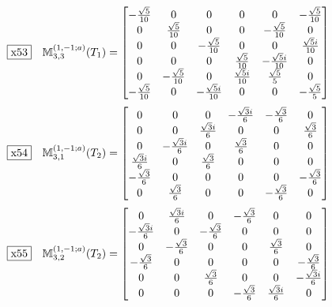 \documentclass[fleqn,10pt,landscape]{jsarticle}
\begin{document}
\begin{dmath*}
\fbox{x53}\quad \mathbb{M}_{3,3}^{(1,-1;a)}(T_{1})=\begin{bmatrix} - \frac{\sqrt{5}}{10} & 0 & 0 & 0 & 0 & - \frac{\sqrt{5}}{10} \\ 0 & \frac{\sqrt{5}}{10} & 0 & 0 & - \frac{\sqrt{5}}{10} & 0 \\ 0 & 0 & - \frac{\sqrt{5}}{10} & 0 & 0 & \frac{\sqrt{5} i}{10} \\ 0 & 0 & 0 & \frac{\sqrt{5}}{10} & - \frac{\sqrt{5} i}{10} & 0 \\ 0 & - \frac{\sqrt{5}}{10} & 0 & \frac{\sqrt{5} i}{10} & \frac{\sqrt{5}}{5} & 0 \\ - \frac{\sqrt{5}}{10} & 0 & - \frac{\sqrt{5} i}{10} & 0 & 0 & - \frac{\sqrt{5}}{5} \end{bmatrix}
\end{dmath*}
\begin{dmath*}
\fbox{x54}\quad \mathbb{M}_{3,1}^{(1,-1;a)}(T_{2})=\begin{bmatrix} 0 & 0 & 0 & - \frac{\sqrt{3} i}{6} & - \frac{\sqrt{3}}{6} & 0 \\ 0 & 0 & \frac{\sqrt{3} i}{6} & 0 & 0 & \frac{\sqrt{3}}{6} \\ 0 & - \frac{\sqrt{3} i}{6} & 0 & \frac{\sqrt{3}}{6} & 0 & 0 \\ \frac{\sqrt{3} i}{6} & 0 & \frac{\sqrt{3}}{6} & 0 & 0 & 0 \\ - \frac{\sqrt{3}}{6} & 0 & 0 & 0 & 0 & - \frac{\sqrt{3}}{6} \\ 0 & \frac{\sqrt{3}}{6} & 0 & 0 & - \frac{\sqrt{3}}{6} & 0 \end{bmatrix}
\end{dmath*}
\begin{dmath*}
\fbox{x55}\quad \mathbb{M}_{3,2}^{(1,-1;a)}(T_{2})=\begin{bmatrix} 0 & \frac{\sqrt{3} i}{6} & 0 & - \frac{\sqrt{3}}{6} & 0 & 0 \\ - \frac{\sqrt{3} i}{6} & 0 & - \frac{\sqrt{3}}{6} & 0 & 0 & 0 \\ 0 & - \frac{\sqrt{3}}{6} & 0 & 0 & \frac{\sqrt{3}}{6} & 0 \\ - \frac{\sqrt{3}}{6} & 0 & 0 & 0 & 0 & - \frac{\sqrt{3}}{6} \\ 0 & 0 & \frac{\sqrt{3}}{6} & 0 & 0 & - \frac{\sqrt{3} i}{6} \\ 0 & 0 & 0 & - \frac{\sqrt{3}}{6} & \frac{\sqrt{3} i}{6} & 0 \end{bmatrix}
\end{dmath*}
\end{document}

